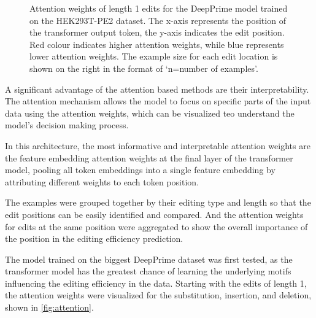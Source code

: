 \begin{figure}
    \centering
    \caption[Attention weights for the DeepPrime model trained on the HEK293T-PE2 dataset]{Attention weights of length 1 edits for the DeepPrime model trained on the HEK293T-PE2 dataset. The x-axis represents the position of the transformer output token, the y-axis indicates the edit position. Red colour indicates higher attention weights, while blue represents lower attention weights. The example size for each edit location is shown on the right in the format of `n=number of examples'.}
    \label{fig:attention}
\end{figure}

A significant advantage of the attention based methods are their interpretability. The attention mechanism allows the model to focus on specific parts of the input data using the attention weights, which can be visualized teo understand the model's decision making process. 

In this architecture, the most informative and interpretable attention weights are the feature embedding attention weights at the final layer of the transformer model, pooling all token embeddings into a single feature embedding by attributing different weights to each token position. 

The examples were grouped together by their editing type and length so that the edit positions can be easily identified and compared. And the attention weights for edits at the same position were aggregated to show the overall importance of the position in the editing efficiency prediction.

The model trained on the biggest DeepPrime dataset was first tested, as the transformer model has the greatest chance of learning the underlying motifs influencing the editing efficiency in the data. Starting with the edits of length 1, the attention weights were visualized for the substitution, insertion, and deletion, shown in \autoref{fig:attention}. 

